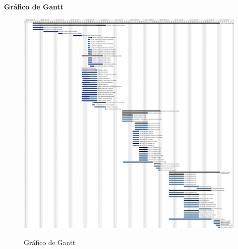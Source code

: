   \pagebreak
  \textbf{Gráfico de Gantt}
   
   \begin{figure}[!h]
    \centering
    \includegraphics[scale = 0.2]{editaveis/figuras/gantt}
    \label{Gráfico de Gantt}
    \caption{Gráfico de Gantt}
   \end{figure}
   \FloatBarrier
